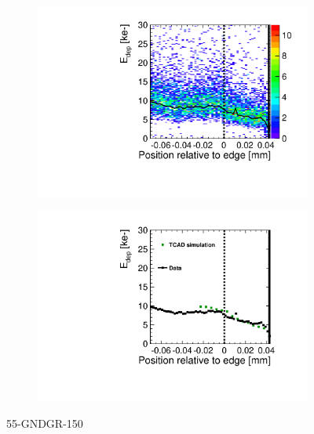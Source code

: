 \begin{figure}[htbp]
  \centering
  \begin{subfigure}[b]{0.5\textwidth}
    \includegraphics[width=\textwidth]{figures/ActiveEdge/TCAD_data_Edep_55_GNDGR_150.pdf}
    \caption{}
  \end{subfigure}\hfill
  \begin{subfigure}[b]{0.5\textwidth}
    \includegraphics[width=\textwidth]{figures/ActiveEdge/TCAD_data_55_GNDGR_150.pdf}
    \caption{}
  \end{subfigure}
  \caption{55-GNDGR-150}
  \label{fig:TCAD_vs_data_55_GNDGR_150}
\end{figure}





